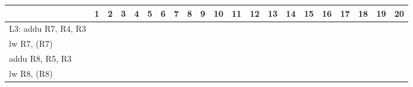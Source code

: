 \documentclass[a4paper,10pt]{article}
\begin{document}
\begin{enumerate}
{\begin{enumerate}
{                %
\begin{table}[!hbpt]
\begin{tabular}{|l|c|c|c|c|c|c|c|c|c|c|c|c|c|c|c|c|c|l|l|l|}
\hline
                    & \multicolumn{1}{l|}{1} & \multicolumn{1}{l|}{2} & \multicolumn{1}{l|}{3} & \multicolumn{1}{l|}{4} & \multicolumn{1}{l|}{5} & \multicolumn{1}{l|}{6} & \multicolumn{1}{l|}{7} & \multicolumn{1}{l|}{8} & \multicolumn{1}{l|}{9} & \multicolumn{1}{l|}{10} & \multicolumn{1}{l|}{11} & \multicolumn{1}{l|}{12} & \multicolumn{1}{l|}{13} & \multicolumn{1}{l|}{14} & \multicolumn{1}{l|}{15} & \multicolumn{1}{l|}{16} & \multicolumn{1}{l|}{17} & 18 & 19 & 20 \\ \hline
L3: addu R7, R4, R3 &                        &                        &                        &                        &                        &                        &                        &                        &                        &                         &                         &                         &                         &                         &                         &                         &                         &    &    &    \\ \hline
lw R7, (R7)         &                        &                        &                        &                        &                        &                        &                        &                        &                        &                         &                         &                         &                         &                         &                         &                         &                         &    &    &    \\ \hline
addu R8, R5, R3     &                        &                        &                        &                        &                        &                        &                        &                        &                        &                         &                         &                         &                         &                         &                         &                         &                         &    &    &    \\ \hline
lw R8, (R8)         &                        &                        &                        &                        &                        &                        &                        &                        &                        &                         &                         &                         &                         &                         &                         &                         &                         &    &    &    \\ \hline

\end{tabular}
\end{table}}
\end{enumerate}}
\end{enumerate}
\end{document}
